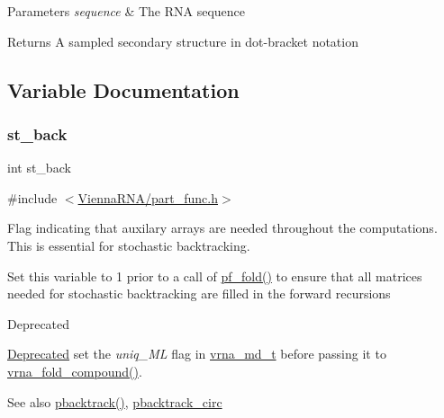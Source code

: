 \begin{DoxyParams}{Parameters}
{\em sequence} & The R\+NA sequence \\
\hline
\end{DoxyParams}
\begin{DoxyReturn}{Returns}
A sampled secondary structure in dot-\/bracket notation 
\end{DoxyReturn}


\subsection{Variable Documentation}
\mbox{\label{group__subopt__stochbt__deprecated_gacd79b1a570e6ad9be24cb11fe8cae30a}} 
\subsubsection{\texorpdfstring{st\_back}{st\_back}}
{\footnotesize\ttfamily int st\+\_\+back}



{\ttfamily \#include $<$\mbox{\hyperlink{part__func_8h}{Vienna\+R\+N\+A/part\+\_\+func.\+h}}$>$}



Flag indicating that auxilary arrays are needed throughout the computations. This is essential for stochastic backtracking. 

Set this variable to 1 prior to a call of \mbox{\hyperlink{group__part__func__global__deprecated_gadc3db3d98742427e7001a7fd36ef28c2}{pf\+\_\+fold()}} to ensure that all matrices needed for stochastic backtracking are filled in the forward recursions

\begin{DoxyRefDesc}{Deprecated}
\item[\mbox{\hyperlink{deprecated__deprecated000096}{Deprecated}}]set the {\itshape uniq\+\_\+\+ML} flag in \mbox{\hyperlink{group__model__details_ga1f8a10e12a0a1915f2a4eff0b28ea17c}{vrna\+\_\+md\+\_\+t}} before passing it to \mbox{\hyperlink{group__fold__compound_ga6601d994ba32b11511b36f68b08403be}{vrna\+\_\+fold\+\_\+compound()}}.\end{DoxyRefDesc}


\begin{DoxySeeAlso}{See also}
\mbox{\hyperlink{group__subopt__stochbt__deprecated_gac03ca6db186bb3bf0a2a326d7fb3ba03}{pbacktrack()}}, \mbox{\hyperlink{group__subopt__stochbt__deprecated_ga00474051204ac9ad576b3e45174d03ff}{pbacktrack\+\_\+circ}} 
\end{DoxySeeAlso}
